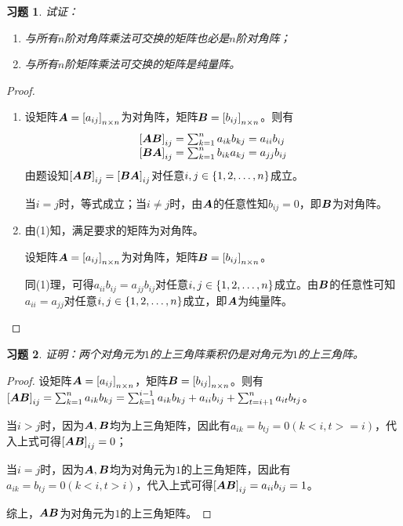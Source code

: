 \documentclass{ctexart}
\newtheorem{problem}{习题}[section]
\begin{document}
\begin{problem}
试证：
\begin{enumerate}
    \item 与所有\(n\)阶对角阵乘法可交换的矩阵也必是\(n\)阶对角阵；
    \item 与所有\(n\)阶矩阵乘法可交换的矩阵是纯量阵。
\end{enumerate}
\end{problem}
\begin{proof}
    \begin{enumerate}
        \item
              {
              设矩阵\(\boldsymbol{A}=\left[ a_{ij} \right]_{n\times n}\)为对角阵，矩阵\(\boldsymbol{B}=\left[ b_{ij} \right]_{n\times n}\)。则有
              \begin{equation*}
                  \begin{array}{lll}
                      \left[ \boldsymbol{A}\boldsymbol{B} \right]_{ij}=\sum_{k=1}^na_{ik}b_{kj}=a_{ii}b_{ij} \\
                      \left[ \boldsymbol{B}\boldsymbol{A} \right]_{ij}=\sum_{k=1}^nb_{ik}a_{kj}=a_{jj}b_{ij}
                  \end{array}
              \end{equation*}
              由题设知\(\left[ \boldsymbol{A}\boldsymbol{B} \right]_{ij}=\left[ \boldsymbol{B}\boldsymbol{A} \right]_{ij}\)对任意\(i,j\in\left\{1,2,\dots,n \right\}\)成立。

              当\(i=j\)时，等式成立；当\(i\neq j\)时，由\(\boldsymbol{A}\)的任意性知\(b_{ij}=0\)，即\(\boldsymbol{B}\)为对角阵。
              }
        \item
              {
              由(1)知，满足要求的矩阵为对角阵。

              设矩阵\(\boldsymbol{A}=\left[ a_{ij} \right]_{n\times n}\)为对角阵，矩阵\(\boldsymbol{B}=\left[ b_{ij} \right]_{n\times n}\)。

              同(1)理，可得\(a_{ii}b_{ij}=a_{jj}b_{ij}\)对任意\(i,j\in\left\{1,2,\dots,n \right\}\)成立。由\(\boldsymbol{B}\)的任意性可知\(a_{ii}=a_{jj}\)对任意\(i,j\in\left\{1,2,\dots,n \right\}\)成立，即\(\boldsymbol{A}\)为纯量阵。
              }
    \end{enumerate}
\end{proof}

\begin{problem}
证明：两个对角元为\(1\)的上三角阵乘积仍是对角元为\(1\)的上三角阵。
\end{problem}
\begin{proof}
    设矩阵\(\boldsymbol{A}=\left[ a_{ij} \right]_{n\times n}\)，矩阵\(\boldsymbol{B}=\left[ b_{ij} \right]_{n\times n}\)。则有\(\left[ \boldsymbol{A}\boldsymbol{B} \right]_{ij}=\sum_{k=1}^na_{ik}b_{kj}=\sum_{k=1}^{i-1}a_{ik}b_{kj}+a_{ii}b_{ij}+\sum_{t=i+1}^na_{it}b_{tj}\)。

    当\(i>j\)时，因为\(\boldsymbol{A},\boldsymbol{B}\)均为上三角矩阵，因此有\(a_{ik}=b_{tj}=0(k<i,t>=i)\)，代入上式可得\(\left[ \boldsymbol{A}\boldsymbol{B} \right]_{ij}=0\)；

    当\(i=j\)时，因为\(\boldsymbol{A},\boldsymbol{B}\)均为对角元为\(1\)的上三角矩阵，因此有\(a_{ik}=b_{tj}=0(k<i,t>i)\)，代入上式可得\(\left[ \boldsymbol{A}\boldsymbol{B} \right]_{ij}=a_{ii}b_{ij}=1\)。

    综上，\(\boldsymbol{A}\boldsymbol{B}\)为对角元为\(1\)的上三角矩阵。
\end{proof}
\end{document}
